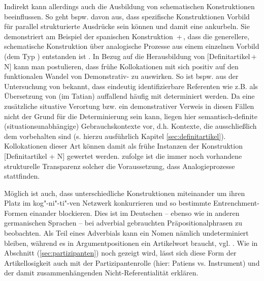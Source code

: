 Indirekt kann allerdings auch  die Ausbildung von schematischen Konstruktionen  beeinflussen. So geht bspw. \textcite[96]{Bybee2010} davon aus, dass spezifische Konstruktionen  Vorbild für parallel strukturierte Ausdrücke sein können und damit eine  ankurbeln. Sie demonstriert am Beispiel der spanischen Konstruktion   \,+\,, dass die generellere, schematische  Konstruktion   über analogische Prozesse  aus einem einzelnen Vorbild (dem Typ ) entstanden ist \parencite[72]{Bybee2010}. In Bezug auf die Herausbildung von [Definitartikel\,+\,N] kann man postulieren, dass frühe Kollokationen mit  sich positiv auf den funktionalen Wandel von Demonstrativ-  zu  auswirken. So ist bspw. aus der Untersuchung von \textcite{Oubouzar1992} bekannt, dass eindeutig identifizierbare Referenten wie  z.B.  als Übersetzung von  (im Tatian) auffallend häufig mit  determiniert werden. Da eine zusätzliche situative  Verortung bzw. ein demonstrativer Verweis in diesen Fällen nicht der Grund für die Determinierung sein kann, liegen hier semantisch-definite   (situationsunabhängige) Gebrauchskontexte vor, d.h. Kontexte, die ausschließlich dem  vorbehalten sind (s. hierzu ausführlich Kapitel \ref{sec:definitartikel}). Kollokationen dieser Art können damit als frühe Instanzen der Konstruktion   [Definitartikel + N] gewertet werden. \textcite[96]{Bybee2010} zufolge ist die immer noch vorhandene strukturelle Transparenz solcher  die Voraussetzung, dass Analogieprozesse  stattfinden.   

Möglich ist auch, dass unterschiedliche Konstruktionen miteinander um ihren Platz im kog"-ni"-ti"-ven Netzwerk konkurrieren und so bestimmte Entrenchment-Formen  einander blockieren. Dies ist im Deutschen -- ebenso wie in anderen germanischen Sprachen \parencite[s.][]{Himmelmann1998} -- bei adverbial  gebrauchten Präpositionalphrasen  zu beobachten. Als Teil eines Adverbials  kann ein Nomen nämlich undeterminiert bleiben, während es in Argumentpositionen ein Artikelwort braucht, vgl. . Wie in Abschnitt (\ref{sec:partizipanten}) noch gezeigt wird, lässt sich diese Form der Artikellosigkeit auch mit der Partizipantenrolle 
 (hier: Patiens vs. Instrument) und der damit zusammenhängenden Nicht-Referentialität  erklären.  

